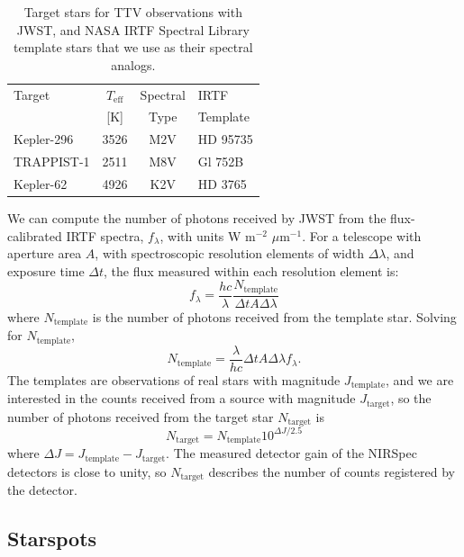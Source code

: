 \begin{table}
\centering
\begin{tabular}{lccl}
Target & $T_{\mathrm{eff}}$ & Spectral & IRTF\\
 & [K] & Type & Template \\ \hline\hline
Kepler-296 & 3526 & M2V & HD 95735 \\
TRAPPIST-1 & 2511 & M8V & Gl 752B\\
Kepler-62 & 4926 & K2V & HD 3765\\
\end{tabular}
\caption{Target stars for TTV observations with JWST, and NASA IRTF Spectral Library template stars that we use as their spectral analogs. \label{tab:temps}}
\end{table}

We can compute the number of photons received by JWST from the flux-calibrated IRTF spectra, $f_\lambda$, with units W m$^{-2}$ $\mu$m$^{-1}$. For a telescope with aperture area $A$, with spectroscopic resolution elements of width $\Delta \lambda$, and exposure time $\Delta t$, the flux measured within each resolution element is: 
\begin{equation}
f_\lambda = \frac{hc}{\lambda} \frac{N_{\mathrm{template}}}{\Delta t A \Delta \lambda}
\end{equation}
where $N_{\mathrm{template}}$ is the number of photons received from the template star. Solving for $N_{\mathrm{template}}$,
\begin{equation}
N_{\mathrm{template}} = \frac{\lambda}{hc} \Delta t A \Delta \lambda f_\lambda.
\end{equation}
The templates are observations of real stars with magnitude $J_{\mathrm{template}}$, and we are interested in the counts received from a source with magnitude $J_{\mathrm{target}}$, so the number of photons received from the target star $N_{\mathrm{target}}$ is
\begin{equation}
N_\mathrm{target} = N_\mathrm{template} 10^{\Delta J / 2.5}
\end{equation}
where $\Delta J=J_\mathrm{template} - J_\mathrm{target}$. The measured detector gain of the NIRSpec detectors is close to unity, so $N_\mathrm{target}$ describes the number of counts registered by the detector. 

\subsection{Starspots}

